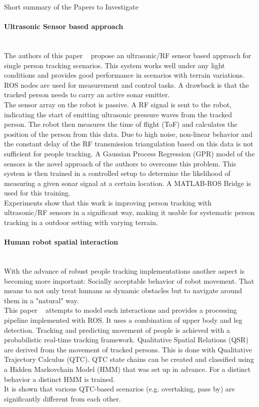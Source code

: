 \documentclass[a4paper,oneside,10pt,DIV12,headsepline,footexclude,headexclude]{scrartcl}
\begin{document}
\begin{section}{Short summary of the Papers to Investigate}
\paragraph{Ultrasonic Sensor based approach}
\mbox{} \\
The authors of this paper ~\cite{7064565} propose an ultrasonic/RF sensor 
based approach for single person tracking scenarios.
This system works well under any light conditions and provides good performance
in scenarios with terrain variations. 
ROS nodes are used for measurement and control tasks. A drawback is that the 
tracked person needs to carry an active sonar emitter.
\\
The sensor array on the robot is passive. A RF signal is sent to the robot,
indicating the start of emitting ultrasonic pressure waves from the tracked person.
The robot then measures the time of flight (ToF) and calculates the position
of the person from this data. Due to high noise, non-linear behavior and the
constant delay of the RF transmission triangulation based on this data is not
sufficient for people tracking. A Gaussian Process Regression (GPR) model of the
sensors is the novel approach of the authors to overcome this problem.
This system is then trained in a controlled setup to determine the likelihood
of measuring a given sonar signal at a certain location. A MATLAB-ROS Bridge is
used for this training.\\
Experiments show that this work is improving person tracking with ultrasonic/RF sensors
in a significant way, making it usable for systematic person tracking in a
outdoor setting with varying terrain.


\paragraph{Human robot spatial interaction}
\mbox{} \\
With the advance of robust people tracking implementations another aspect is 
becoming more important: Socially acceptable behavior of robot movement. That
means to not only treat humans as dynamic obstacles but to navigate around them
in a "natural" way.\\
This paper ~\cite{dondrup2015tracker} attempts to model such interactions and 
provides a processing pipeline implemented with ROS. It uses a 
combination of upper body and leg detection. Tracking and predicting movement of
people is achieved with a probabilistic real-time tracking framework.
Qualitative Spatial Relations (QSR) are derived from the movement of tracked
persons. This is done with Qualitative Trajectory Calculus (QTC). 
QTC state chains can be created and classified using a Hidden Markovchain Model (HMM)
that was set up in advance. For a distinct behavior a distinct HMM is trained.\\
It is shown that various QTC-based scenarios (e.g. overtaking, pass by) are 
significantly different from each other.\\

\end{section}




\end{document}
